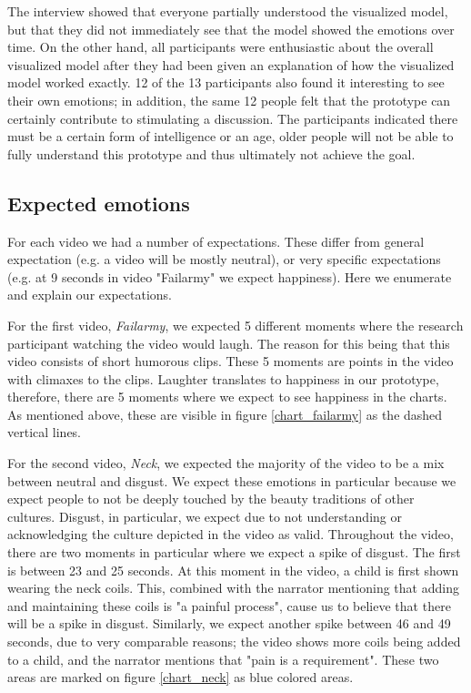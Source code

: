 \documentclass[sigconf]{acmart}
\begin{document}
The interview showed that everyone partially understood the visualized model, but that they did not immediately
see that the model showed the emotions over time. On the other hand, all participants were enthusiastic about
the overall visualized model after they had been given an explanation of how the visualized model worked
exactly. 12 of the 13 participants also found it interesting to see their own emotions; in addition,
the same 12 people felt that the prototype can certainly contribute to stimulating a discussion.
The participants indicated there must be a certain form of intelligence or an age, older people will not be
able to fully understand this prototype and thus ultimately not achieve the goal.

\subsection{Expected emotions}
For each video we had a number of expectations. These differ from general expectation (e.g. a video will be
mostly neutral), or very specific expectations (e.g. at 9 seconds in video "Failarmy" we expect happiness).
Here we enumerate and explain our expectations.

For the first video, \emph{Failarmy}, we expected 5 different moments where the research participant watching
the video would laugh. The reason for this being that this video consists of short humorous clips. These 5
moments are points in the video with climaxes to the clips. Laughter translates to happiness in our prototype,
therefore, there are 5 moments where we expect to see happiness in the charts. As mentioned above,
these are visible in figure \ref{chart_failarmy} as the dashed vertical lines.

For the second video, \emph{Neck}, we expected the majority of the video to be a mix between neutral and disgust.
We expect these emotions in particular because we expect people to not be deeply touched by the beauty
traditions of other cultures. Disgust, in particular, we expect due to not understanding or acknowledging the
culture depicted in the video as valid. Throughout the video, there are two moments in particular where we
expect a spike of disgust. The first is between 23 and 25 seconds. At this moment in the video, a child is first
shown wearing the neck coils. This, combined with the narrator mentioning that adding and maintaining these coils
is "a painful process", cause us to believe that there will be a spike in disgust. Similarly, we expect another
spike between 46 and 49 seconds, due to very comparable reasons; the video shows more coils being added to a
child, and the narrator mentions that "pain is a requirement". These two areas are marked on figure
\ref{chart_neck} as blue colored areas.
\end{document}
